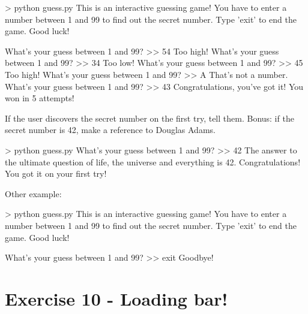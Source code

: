 \documentclass[]{article}
\newenvironment{Shaded}{\begin{snugshade}}{\end{snugshade}}
\newcommand{\NormalTok}[1]{\textcolor[rgb]{0.81,0.81,0.76}{#1}}
\begin{document}
\begin{Shaded}
\begin{Highlighting}[]
\NormalTok{> python guess.py}
\NormalTok{This is an interactive guessing game!}
\NormalTok{You have to enter a number between 1 and 99 to find out the secret number.}
\NormalTok{Type 'exit' to end the game.}
\NormalTok{Good luck!}

\NormalTok{What's your guess between 1 and 99?}
\NormalTok{>> 54}
\NormalTok{Too high!}
\NormalTok{What's your guess between 1 and 99?}
\NormalTok{>> 34}
\NormalTok{Too low!}
\NormalTok{What's your guess between 1 and 99?}
\NormalTok{>> 45}
\NormalTok{Too high!}
\NormalTok{What's your guess between 1 and 99?}
\NormalTok{>> A}
\NormalTok{That's not a number.}
\NormalTok{What's your guess between 1 and 99?}
\NormalTok{>> 43}
\NormalTok{Congratulations, you've got it!}
\NormalTok{You won in 5 attempts!}
\end{Highlighting}
\end{Shaded}

If the user discovers the secret number on the first try, tell them.
Bonus: if the secret number is 42, make a reference to Douglas Adams.

\begin{Shaded}
\begin{Highlighting}[]
\NormalTok{> python guess.py}
\NormalTok{What's your guess between 1 and 99?}
\NormalTok{>> 42}
\NormalTok{The answer to the ultimate question of life, the universe and everything is 42.}
\NormalTok{Congratulations! You got it on your first try!}
\end{Highlighting}
\end{Shaded}

Other example:

\begin{Shaded}
\begin{Highlighting}[]
\NormalTok{> python guess.py}
\NormalTok{This is an interactive guessing game!}
\NormalTok{You have to enter a number between 1 and 99 to find out the secret number.}
\NormalTok{Type 'exit' to end the game.}
\NormalTok{Good luck!}

\NormalTok{What's your guess between 1 and 99?}
\NormalTok{>> exit}
\NormalTok{Goodbye!}
\end{Highlighting}
\end{Shaded}

\clearpage

\hypertarget{exercise-10---loading-bar-1}{%
\section{Exercise 10 - Loading bar!}\label{exercise-10---loading-bar-1}}
\end{document}

